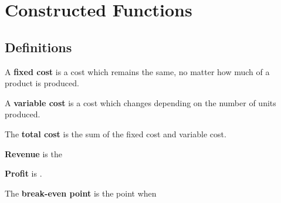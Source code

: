 \documentclass[notes]{subfiles}
\begin{document}
	\fancyhead[LO,RE]{\bfseries \currentname}
	\fancyfoot[C]{{}}
	\fancyfoot[RO,LE]{\large \thepage}	%


\section*{Constructed Functions}\label{cs17}
	\subsection*{Definitions}
		\begin{defn} 
			A \textbf{fixed cost} is a cost which remains the same, no matter how much of a product is produced.
		\end{defn}

			
		\begin{defn} 
			A \textbf{variable cost} is a cost which changes depending on the number of units produced.
		\end{defn}

			
		\begin{defn} 
			The \textbf{total cost} is the sum of the fixed cost and variable cost.
		\end{defn}

			
		\begin{defn}[Revenue] 
			\textbf{Revenue} is the  
		\end{defn}

			
		\begin{defn}[Profit] 
			\textbf{Profit} is .
		\end{defn}

			
		\begin{defn} 
			The \textbf{break-even point} is the point when 
		\end{defn}
				
\end{document}
